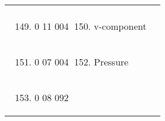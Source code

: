 \begin{longtable}[]{@{}llll@{}}
\begin{minipage}[t]{0.22\columnwidth}
\strut
\end{minipage}\tabularnewline
\begin{minipage}[t]{0.22\columnwidth}\raggedright
\strut
\end{minipage} & \begin{minipage}[t]{0.22\columnwidth}\raggedright
\begin{enumerate}
\setcounter{enumi}{148}
\item
  0 11 004
\end{enumerate}\strut
\end{minipage} & \begin{minipage}[t]{0.22\columnwidth}\raggedright
\begin{enumerate}
\setcounter{enumi}{149}
\item
  v-component
\end{enumerate}\strut
\end{minipage} & \begin{minipage}[t]{0.22\columnwidth}\raggedright
\strut
\end{minipage}\tabularnewline
\begin{minipage}[t]{0.22\columnwidth}\raggedright
\strut
\end{minipage} & \begin{minipage}[t]{0.22\columnwidth}\raggedright
\begin{enumerate}
\setcounter{enumi}{150}
\item
  0 07 004
\end{enumerate}\strut
\end{minipage} & \begin{minipage}[t]{0.22\columnwidth}\raggedright
\begin{enumerate}
\setcounter{enumi}{151}
\item
  Pressure
\end{enumerate}\strut
\end{minipage} & \begin{minipage}[t]{0.22\columnwidth}\raggedright
\strut
\end{minipage}\tabularnewline
\begin{minipage}[t]{0.22\columnwidth}\raggedright
\strut
\end{minipage} & \begin{minipage}[t]{0.22\columnwidth}\raggedright
\begin{enumerate}
\setcounter{enumi}{152}
\item
  0 08 092
\end{enumerate}\strut
\end{minipage} & \begin{minipage}[t]{0.22\columnwidth}\raggedright

\end{minipage}
\end{longtable}
